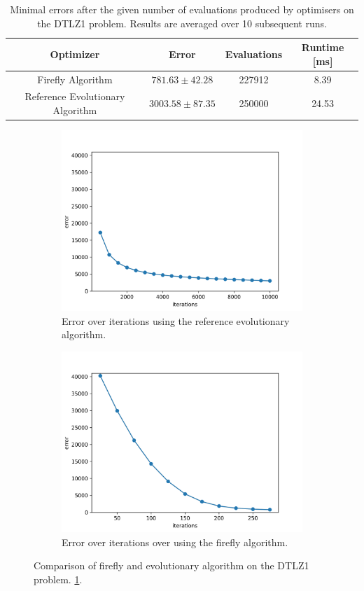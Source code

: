 \begin{table}[H]
  \centering
   \begin{tabular}{|c c c c|}
     \hline
     \textbf{Optimizer} & \textbf{Error} & \textbf{Evaluations} & \textbf{Runtime [ms]} \\
     \hline
     Firefly Algorithm & $781.63 \pm 42.28$ & 227912 & 8.39 \\
     Reference Evolutionary Algorithm & $3003.58 \pm 87.35$ & 250000 & 24.53 \\
     \hline
  \end{tabular}
  \caption{Minimal errors after the given number of evaluations produced by optimisers on the DTLZ1 problem. Results are averaged over 10 subsequent runs.}
  \label{tab:firefly_vs_ea}
\end{table}

\begin{figure}
  \centering
  \begin{subfigure}{.5\textwidth}
    \centering
    \includegraphics[width=0.75\linewidth]{assets/reference.png}
    \caption{Error over iterations using the reference evolutionary algorithm.}
    \label{fig:sub1}
  \end{subfigure}%
  \begin{subfigure}{.5\textwidth}
    \centering
    \includegraphics[width=0.75\linewidth]{assets/firefly.png}
    \caption{Error over iterations over using the firefly algorithm.}
    \label{fig:sub2}
  \end{subfigure}
  \caption{Comparison of firefly and evolutionary algorithm on the DTLZ1 problem. \ref{tab:firefly_vs_ea}.}
  \label{fig:firefly_vs_ea}
\end{figure}

